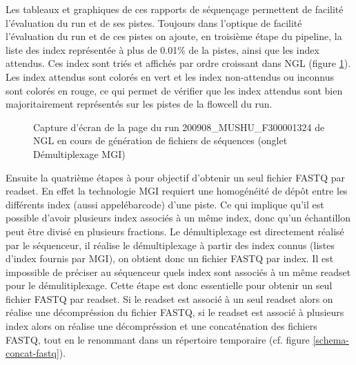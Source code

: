Les tableaux et graphiques de ces rapports de séquençage permettent de facilité l'évaluation du run et de ses pistes.
Toujours dans l'optique de facilité l'évaluation du run et de ces pistes on ajoute, en troisième étape du pipeline, la liste des index représentée à plus de 0.01\% de la pistes, ainsi que les index attendus.
Ces index sont triés et affichés par ordre croissant dans NGL (figure \ref{top-index}).
Les index attendus sont colorés en vert et les index non-attendus ou inconnus sont colorés en rouge, ce qui permet de vérifier que les index attendus sont bien majoritairement représentés sur les pistes de la flowcell du run.

\begin{figure}[H]
    \centering
    \caption{\footnotesize{Capture d'écran de la page du run 200908\_MUSHU\_F300001324 de NGL en cours de génération de fichiers de séquences (onglet \og Démultiplexage MGI\fg{})}}
    \label{top-index}
\end{figure}

Ensuite la quatrième étapes à pour objectif d'obtenir un seul fichier FASTQ par readset.
En effet la technologie MGI requiert une homogénéité de dépôt entre les différents index (aussi appelé\og barcode\fg{}) d'une piste.
Ce qui implique qu'il est possible d'avoir plusieurs index associés à un même index, donc qu'un échantillon peut être divisé en plusieurs fractions.
Le démultiplexage est directement réalisé par le séquenceur, il réalise le démultiplexage à partir des index connus (listes d'index fournis par MGI), on obtient donc un fichier FASTQ par index. Il est impossible de préciser au séquenceur quels index sont associés à un même readset pour le démulitiplexage.
Cette étape est donc essentielle pour obtenir un seul fichier FASTQ par readset.
Si le readset est associé à un seul readset alors on réalise une décompréssion du fichier FASTQ, si le readset est associé à plusieurs index alors on réalise une décompréssion et une concaténation des fichiers FASTQ, tout en le renommant dans un répertoire temporaire (cf. figure \ref{schema-concat-fastq}).

